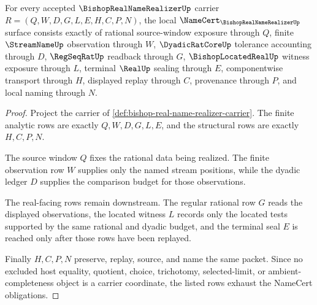 \begin{theorem}
\label{thm:bishop-real-name-realizer-namecert-obligations}
For every accepted $\BishopRealNameRealizerUp$ carrier $R=(Q,W,D,G,L,E,H,C,P,N)$, the local $\NameCert_{\BishopRealNameRealizerUp}$ surface consists exactly of rational source-window exposure through $Q$, finite $\StreamNameUp$ observation through $W$, $\DyadicRatCoreUp$ tolerance accounting through $D$, $\RegSeqRatUp$ readback through $G$, $\BishopLocatedRealUp$ witness exposure through $L$, terminal $\RealUp$ sealing through $E$, componentwise transport through $H$, displayed replay through $C$, provenance through $P$, and local naming through $N$.
\end{theorem}
\begin{proof}
Project the carrier of \autoref{def:bishop-real-name-realizer-carrier}. The finite analytic rows are exactly $Q,W,D,G,L,E$, and the structural rows are exactly $H,C,P,N$.

The source window $Q$ fixes the rational data being realized. The finite observation row $W$ supplies only the named stream positions, while the dyadic ledger $D$ supplies the comparison budget for those observations.

The real-facing rows remain downstream. The regular rational row $G$ reads the displayed observations, the located witness $L$ records only the located tests supported by the same rational and dyadic budget, and the terminal seal $E$ is reached only after those rows have been replayed.

Finally $H,C,P,N$ preserve, replay, source, and name the same packet. Since no excluded host equality, quotient, choice, trichotomy, selected-limit, or ambient-completeness object is a carrier coordinate, the listed rows exhaust the NameCert obligations.
\end{proof}

